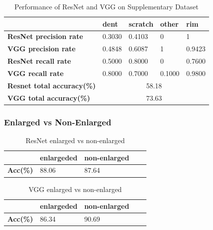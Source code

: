 \documentclass[lang=english,inputenc=utf8,fontsize=10pt]{ldvarticle}
\begin{document}
    \begin{table}[H]   
    \begin{center}   
    \caption{Performance of ResNet and VGG on Supplementary Dataset}  
    \label{Resnet and VGG generalize} 
    \begin{tabular}{|m{2cm}<{\centering}|m{2cm}<{\centering}|m{2.0cm}<{\centering}|m{2cm}<{\centering}|m{2cm}<{\centering}|}   
    \hline   &\textbf{dent} & \textbf{scratch} & \textbf{other} & \textbf{rim}\\ 
    \hline   \textbf{ResNet precision rate}  & 0.3030  & 0.4103 & 0 & 1  \\ 
    \hline   \textbf{VGG precision rate}  & 0.4848 & 0.6087 & 1 & 0.9423 \\ 
    \hline   \textbf{ResNet recall rate} & 0.5000 & 0.8000 & 0 & 0.7600  \\  
    \hline   \textbf{VGG recall rate} & 0.8000  & 0.7000 & 0.1000 & 0.9800   \\  
    \hline   \textbf{Resnet total accuracy(\%)} & \multicolumn{4}{|c|}{58.18} \\  
    \hline   \textbf{VGG total accuracy(\%)} & \multicolumn{4}{|c|}{73.63} \\
    \hline 
    \end{tabular}   
    \end{center}   
\end{table}
\subsubsection{Enlarged vs Non-Enlarged}
    \begin{table}[H]   
    \begin{center}   
    \caption{ResNet enlarged vs non-enlarged}  
    \label{Resnet enlarge} 
    \begin{tabular}{|m{2cm}<{\centering}|m{2cm}<{\centering}|m{2.0cm}<{\centering}|m{2cm}<{\centering}|m{2cm}<{\centering}|}   
    \hline   &\textbf{enlargeded} & \textbf{non-enlarged}\\ 
    \hline   \textbf{Acc(\%)}  & 88.06 & 87.64   \\ 
    \hline 
    \end{tabular}   
    \end{center}   
    \end{table}
    
    \begin{table}[H]   
    \begin{center}   
    \caption{VGG enlarged vs non-enlarged}  
    \label{Resnet enlarge} 
    \begin{tabular}{|m{2cm}<{\centering}|m{2cm}<{\centering}|m{2.0cm}<{\centering}|m{2cm}<{\centering}|m{2cm}<{\centering}|}   
    \hline   &\textbf{enlargeded} & \textbf{non-enlarged}\\ 
    \hline   \textbf{Acc(\%)}  & 86.34 & 90.69  \\ 
    \hline 
    \end{tabular}   
    \end{center}   
    \end{table}
    
\end{document}
